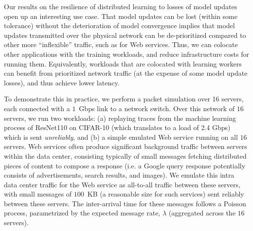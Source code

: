 \documentclass{article}
\begin{document}
Our results on the resilience of distributed learning to losses of model updates open up an interesting use case. That model updates can be lost (within some tolerance) without the deterioration of model convergence implies that model updates transmitted over the physical network can be de-prioritized compared to other more ``inflexible'' traffic, such as for Web services. Thus, we can colocate other applications with the training workloads, and reduce infrastructure costs for running them. Equivalently, workloads that are colocated with learning workers can benefit from prioritized network traffic (at the expense of some model update losses), and thus achieve lower latency.


To demonstrate this in practice, we perform a packet simulation over 16 servers, each connected with a $1$~Gbps link to a network switch. 
Over this network of $16$ servers, we run two workloads: (a) replaying traces from the machine learning process of ResNet110 on CIFAR-10 (which translates to a load of 2.4 Gbps) which is sent \emph{unreliably}, and (b) a simple emulated Web service running on all $16$ servers. Web services often produce significant background traffic between servers within the data center, consisting typically of small messages fetching distributed pieces of content to compose a response (i.e. a Google query response potentially consists of advertisements, search results, and images). We emulate this intra data center traffic for the Web service as all-to-all traffic between these servers, with small messages of $100$~KB (a reasonable size for such services) sent reliably between these servers. The inter-arrival time for these messages follows a Poisson process, parametrized by the expected message rate, $\lambda$ (aggregated across the $16$ servers).  
\end{document}
